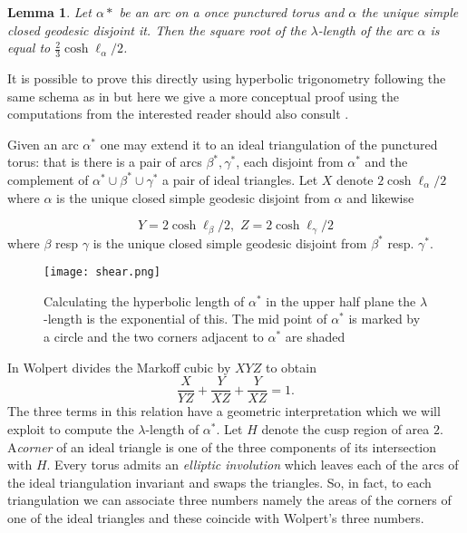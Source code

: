 \documentclass[12pt,a4paper]{amsart}
\newtheorem{lem}[thm]{Lemma}
\begin{document}
\begin{lem}\label{lambda length}
Let $\alpha*$ be an arc on a once punctured torus 
and $\alpha$ the unique 
simple closed geodesic disjoint it.
Then the square root of the $\lambda$-length  of the arc $\alpha$
is equal to $\frac{2}{3}\cosh \ell_\alpha / 2$.
\end{lem}

It is possible to prove this directly using hyperbolic trigonometry 
following the same schema as in \cite{thesis}
but here we give a more conceptual proof  using the computations from \cite{saw}
the interested reader should also consult \cite{yi thesis}.

Given an arc $\alpha^*$ one may extend it to an ideal triangulation of the
punctured torus: that is there is a pair of arcs $\beta^*,\gamma^*$, each
disjoint from  $\alpha^*$ and the complement of $\alpha^* \cup \beta^* \cup
\gamma^*$ a pair of ideal triangles. Let $X$ denote $2 \cosh \ell_\alpha / 2$
where $\alpha$ is the unique closed simple geodesic disjoint from $\alpha$ and
likewise

\begin{equation*}
Y = 2 \cosh \ell_\beta / 2 ,\,\, Z  = 2 \cosh \ell_\gamma / 2 
\end{equation*}
where $\beta$ resp $\gamma$ is the unique closed simple  geodesic disjoint from
$\beta^*$ resp. $\gamma^*$.

\begin{figure}[ht]
\begin{center}
\texttt{[image: shear.png]} 
\end{center}
\caption{Calculating the hyperbolic length of $\alpha^*$ in the upper half plane
the $\lambda$-length is the exponential of this.
The mid point of $\alpha^*$ is marked by a circle and
the two corners adjacent to $\alpha^*$ are shaded}
\label{penner}
\end{figure}

In  \cite{saw} Wolpert divides the Markoff cubic by $XYZ$ to obtain
$$\frac{X}{YZ} + \frac{Y}{XZ} + \frac{Y}{XZ} = 1.$$
The three terms in this relation have a geometric interpretation
which we will exploit to compute the $\lambda$-length of $\alpha^*$.
Let $H$ denote the cusp region of area $2$. 
A\textit{corner} of an ideal triangle is one of the 
three components of its intersection with $H$.
Every torus admits an \textit{elliptic involution}
which leaves each of the arcs of the ideal triangulation  invariant
 and swaps the triangles.
So, in fact, to each triangulation we can associate three numbers
namely the areas of the corners of one of the  ideal triangles
and these coincide with Wolpert's three numbers.
\end{document}
